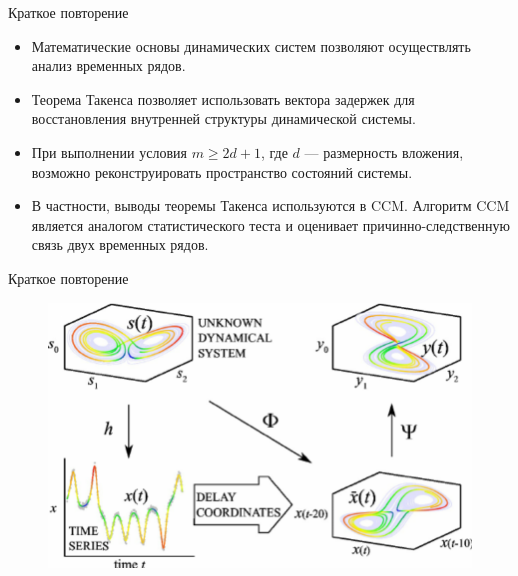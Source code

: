 
\usepackage{tikz}
\usepackage{amsmath}
\usepackage[english,russian]{babel}
\usepackage[labelformat=empty]{caption}

\usepackage{graphicx,animate}
\usepackage{animate}

\usetikzlibrary{arrows,shapes,positioning,shadows,trees}
\newcommand*{\defeq}{\stackrel{\text{def}}{=}}


\begin{frame}[plain]
\titlepage
\end{frame}
\begin{frame}{Краткое повторение}
\begin{itemize}
    \item Математические основы динамических систем позволяют осуществлять анализ временных рядов.
    \item Теорема Такенса позволяет использовать вектора задержек для восстановления внутренней структуры динамической системы.
    \item При выполнении условия $m \geq 2d + 1$, где $d$ — размерность вложения, возможно реконструировать пространство состояний системы.
    \item В частности, выводы теоремы Такенса используются в CCM. Алгоритм CCM является аналогом статистического теста и оценивает причинно-следственную связь двух временных рядов.
\end{itemize}
\end{frame}
\begin{frame}{Краткое повторение}
\begin{figure}
    \centering
    \includegraphics[width=\textwidth]{lecture_5/figs/CCM-1.png}
\end{figure}
\end{frame}
